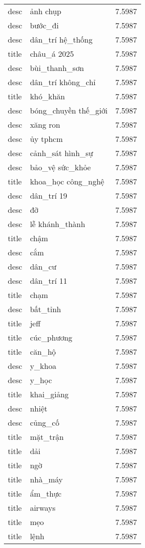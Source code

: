 \documentclass{article}
\begin{document}
\begin{tabular}{lll}
desc & ảnh chụp & 7.5987\\
desc & bước\_đi & 7.5987\\
desc & dân\_trí hệ\_thống & 7.5987\\
title & châu\_á 2025 & 7.5987\\
desc & bùi\_thanh\_sơn & 7.5987\\
desc & dân\_trí không\_chỉ & 7.5987\\
title & khó\_khăn & 7.5987\\
desc & bóng\_chuyền thế\_giới & 7.5987\\
desc & xăng ron & 7.5987\\
desc & ủy tphcm & 7.5987\\
desc & cảnh\_sát hình\_sự & 7.5987\\
desc & bảo\_vệ sức\_khỏe & 7.5987\\
title & khoa\_học công\_nghệ & 7.5987\\
desc & dân\_trí 19 & 7.5987\\
desc & đỡ & 7.5987\\
desc & lễ khánh\_thành & 7.5987\\
title & chậm & 7.5987\\
desc & cắm & 7.5987\\
desc & dân\_cư & 7.5987\\
desc & dân\_trí 11 & 7.5987\\
title & chạm & 7.5987\\
desc & bất\_tỉnh & 7.5987\\
title & jeff & 7.5987\\
title & cúc\_phương & 7.5987\\
title & căn\_hộ & 7.5987\\
desc & y\_khoa & 7.5987\\
desc & y\_học & 7.5987\\
title & khai\_giảng & 7.5987\\
desc & nhiệt & 7.5987\\
desc & củng\_cố & 7.5987\\
title & mặt\_trận & 7.5987\\
title & dải & 7.5987\\
title & ngờ & 7.5987\\
title & nhà\_máy & 7.5987\\
title & ẩm\_thực & 7.5987\\
title & airways & 7.5987\\
title & mẹo & 7.5987\\
title & lệnh & 7.5987\\

\end{tabular}
\end{document}
